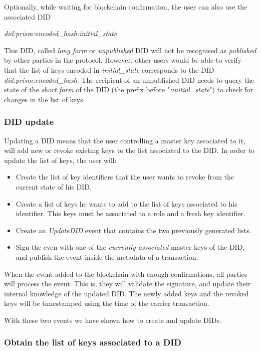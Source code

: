 \documentclass[10pt,a4paper]{article}
\begin{document}
Optionally, while waiting for blockchain confirmation, the user can also use the associated DID 

\begin{center}
\emph{did:prism:encoded\_hash:initial\_state}
\end{center}
	
This DID, called \emph{long form} or \emph{unpublished} DID will not be recognised as \emph{published} by other parties in the protocol. However, other users would be able to verify that the list of keys encoded in \emph{initial\_state} corresponds to the DID \emph{did:prism:encoded\_hash}. The recipient of an unpublished DID needs to query the state of the \emph{short form} of the DID (the prefix before "\emph{:initial\_state}") to check for changes in the list of keys. 

\subsubsection{DID update}

Updating a DID means that the user controlling a master key associated to it, will add new or revoke existing keys to the list associated to the DID. In order to update the list of keys, the user will:
\begin{itemize}
\item Create the list of key identifiers that the user wants to revoke from the current state of his DID.
\item Create a list of keys he wants to add to the list of keys associated to his identifier. 
      This keys must be associated to a role and a fresh key identifier.
\item Create an \emph{UpdateDID} event that contains the two previously generated lists.
\item Sign the even with one of the \emph{currently associated} master keys of the DID, and publish the event inside the metadata of a transaction.
\end{itemize}

When the event added to the blockchain with enough confirmations, all parties will process the event. This is, they will validate the signature, and update their internal knowledge of the updated DID. The newly added keys and the revoked keys will be timestamped using the time of the carrier transaction.

With these two events we have shown how to create and update DIDs. 

\subsubsection{Obtain the list of keys associated to a DID}
\end{document}

